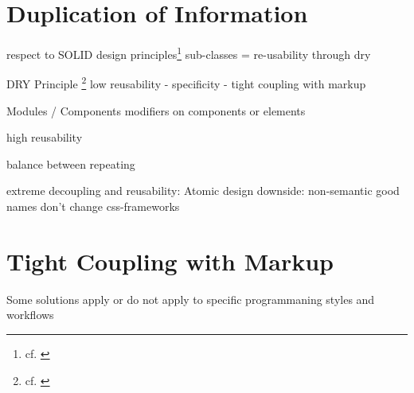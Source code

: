

\section{Duplication of Information}

respect to SOLID design principles\footnote{cf. \cite{solidcss}}
sub-classes = re-usability through dry

DRY Principle \footnote{cf. \cite{pragmaticprogrammer}}
low reusability
- specificity
- tight coupling with markup

Modules / Components
modifiers on components or elements

high reusability

balance between repeating 

extreme decoupling and reusability: Atomic design
downside: non-semantic
good names don't change
css-frameworks

\section{Tight Coupling with Markup}
Some solutions apply or do not apply to specific programmaning styles and workflows

